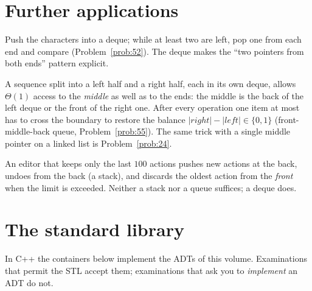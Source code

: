 \section{Further applications}

 Push the characters into a deque; while at least two are left, pop one
from each end and compare (Problem~\ref{prob:52}). The deque makes the ``two
pointers from both ends'' pattern explicit.

 A sequence split into a left half and a right half, each
in its own deque, allows $\Theta(1)$ access to the \emph{middle} as well as to the ends:
the middle is the back of the left deque or the front of the right one. After every
operation one item at most has to cross the boundary to restore the balance
$|\mathit{right}|-|\mathit{left}|\in\{0,1\}$ (front-middle-back queue,
Problem~\ref{prob:55}). The same trick with a single middle pointer on a linked list is
Problem~\ref{prob:24}.

 An editor that keeps only the last $100$ actions pushes new
actions at the back, undoes from the back (a stack), and discards the oldest action from
the \emph{front} when the limit is exceeded. Neither a stack nor a queue suffices; a
deque does.

\section{The standard library}\label{sec:stl}

In C++ the containers below implement the ADTs of this volume. Examinations that permit
the STL accept them; examinations that ask you to \emph{implement} an ADT do not.

